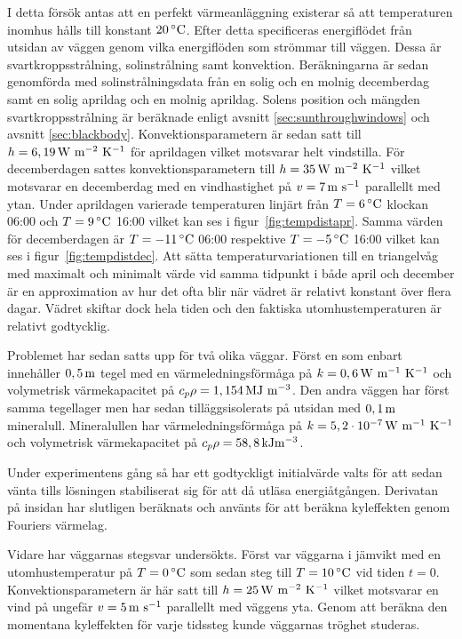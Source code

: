 I detta försök antas att en perfekt värmeanläggning
existerar så att temperaturen inomhus hålls till konstant $\unit[20]{^\circ C}$. Efter detta specificeras energiflödet
från utsidan av väggen genom vilka energiflöden som strömmar till väggen. Dessa är svartkroppsstrålning, solinstrålning
samt konvektion. Beräkningarna är sedan genomförda med solinstrålningsdata från en solig och en molnig decemberdag samt
en solig aprildag och en molnig aprildag. Solens position och mängden svartkroppsstrålning är beräknade enligt avsnitt
\ref{sec:sunthroughwindows} och avsnitt \ref{sec:blackbody}.
Konvektionsparametern är sedan satt till $h=\unit[6,19]{W~m^{-2}~K^{-1}}$ för aprildagen vilket motsvarar helt vindstilla.
För decemberdagen sattes konvektionsparametern till $h=\unit[35]{W~m^{-2}~K^{-1}}$ vilket motsvarar en decemberdag med en vindhastighet på $v=\unit[7]{m~s^{-1}}$ parallellt
med ytan.
Under aprildagen varierade temperaturen linjärt från $T=\unit[6]{^\circ C}$ klockan 06:00 och $T=\unit[9]{^\circ C}$ 16:00 vilket kan ses i figur~\ref{fig:tempdistapr}.
Samma värden för decemberdagen är $T = \unit[-11]{^\circ C}$ 06:00 respektive $T=\unit[-5]{^\circ C}$ 16:00 vilket kan ses i figur~\ref{fig:tempdistdec}. Att sätta temperaturvariationen till en triangelvåg med maximalt och minimalt värde vid samma tidpunkt i både april och december är en approximation av hur det ofta blir när vädret är relativt konstant över flera dagar. Vädret skiftar dock hela tiden och den faktiska utomhustemperaturen är relativt godtycklig.

Problemet har sedan satts upp för två olika väggar. Först en som enbart innehåller $\unit[0,5]{m}$ tegel med
en värmeledningsförmåga på $k = \unit[0,6]{W~m^{-1}~K^{-1}}$ och volymetrisk värmekapacitet på
$c_{p}\rho = \unit[1,154]{MJ~m^{-3}}$. Den andra väggen har först samma tegellager men
har sedan tilläggsisolerats på utsidan med $\unit[0,1]{m}$ mineralull. Mineralullen har värmeledningsförmåga på
$k = \unit[5,2\cdot 10^{-7}]{W~m^{-1}~K^{-1}}$ och volymetrisk värmekapacitet på
$c_{p}\rho = \unit[58,8]{kJ m^{-3}}$. \cite{kandidatarbete2010}\cite{engineeringtoolboxdensity}\cite{bkvthermal}\cite{engineeringtoolboxspecificheat}

Under experimentens gång så har ett godtyckligt initialvärde valts för att sedan vänta tills
lösningen stabiliserat sig för att då utläsa energiåtgången. Derivatan på insidan har slutligen beräknats
och använts för att beräkna kyleffekten genom Fouriers värmelag.

Vidare har väggarnas stegsvar undersökts. Först var väggarna i jämvikt med en utomhustemperatur på $T = \unit[0]{^\circ C}$ som sedan steg till $T = \unit[10]{^\circ C}$ vid tiden $t=0$. Konvektionsparametern är här satt till
$h = \unit[25]{W~m^{-2}~K^{-1}}$ vilket motsvarar en vind på ungefär 
$v = \unit[5]{m~s^{-1}}$ parallellt med väggens yta. Genom att beräkna den momentana kyleffekten för varje tidssteg kunde väggarnas tröghet studeras.

